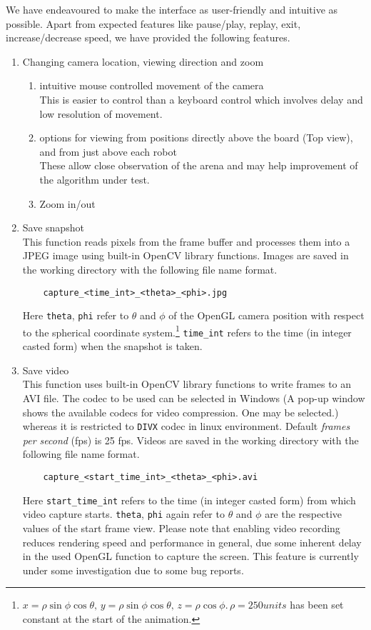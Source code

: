 \documentclass[10pt,a4paper]{article}
\begin{document}
We have endeavoured to make the interface as user-friendly and intuitive as possible. Apart from expected features like pause/play, replay, exit, increase/decrease speed, we have provided the following features.
\begin{enumerate}
\item Changing camera location, viewing direction and zoom
\begin{enumerate}
\item intuitive mouse controlled movement of the camera \\
This is easier to control than a keyboard control which involves delay and low resolution of movement.
\item options for viewing from positions directly above the board (Top view), and from just above each robot \\
These allow close observation of the arena and may help improvement of the algorithm under test.
\item Zoom in/out
\end{enumerate}

\item Save snapshot \\
This function reads pixels from the frame buffer and processes them into a JPEG image using built-in OpenCV library functions. Images are saved in the working directory with the following file name format.
	\begin{verbatim}
	capture_<time_int>_<theta>_<phi>.jpg
	\end{verbatim}
Here \texttt{theta}, \texttt{phi} refer to $\theta$ and $\phi$ of the OpenGL camera position with respect to the spherical coordinate system.\footnote{\sf $x=\rho\sin\phi\cos\theta, \,y=\rho\sin\phi\cos\theta, \,z=\rho\cos\phi. \, \rho=250 units $ has been set constant at the start of the animation.} \texttt{time\_int} refers to the time (in integer casted form) when the snapshot is taken.

\item Save video \\
This function uses built-in OpenCV library functions to write frames to an AVI file. The codec to be used can be selected in Windows (A pop-up window shows the available codecs for video compression. One may be selected.) whereas it is restricted to \texttt{DIVX} codec in linux environment. Default \emph{frames per second} (fps) is 25 fps. Videos are saved in the working directory with the following file name format.
	\begin{verbatim}
	capture_<start_time_int>_<theta>_<phi>.avi
	\end{verbatim}
Here \texttt{start\_time\_int} refers to the time (in integer casted form) from which video capture starts. \texttt{theta}, \texttt{phi} again refer to $\theta$ and $\phi$ are the respective values of the start frame view. Please note that enabling video recording reduces rendering speed and performance in general, due some inherent delay in the used OpenGL function to capture the screen. This feature is currently under some investigation due  to some bug reports.


\end{enumerate}
\end{document}

